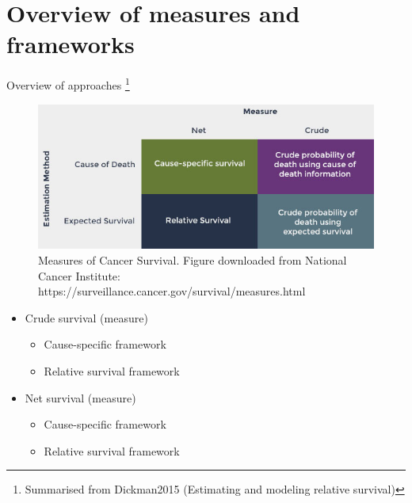 \documentclass{beamer}
\begin{document}
\section{Overview of measures and frameworks}
\begin{frame}{Overview of approaches \footnote{Summarised from Dickman2015 (Estimating and modeling relative survival)}}

\begin{figure}
    \centering
    \includegraphics[scale=0.35]{survival_table.jpg}
    \caption{Measures of Cancer Survival. Figure downloaded from National Cancer Institute: https://surveillance.cancer.gov/survival/measures.html}
    \label{fig:my_label}
\end{figure}
\vspace{-20pt}
\begin{itemize}
    \item Crude survival (measure)

    \begin{itemize}
        \item Cause-specific framework
        \item Relative survival framework
    \end{itemize}
    
    \item Net survival (measure)
      \begin{itemize}
        \item Cause-specific framework
        \item Relative survival framework
    \end{itemize}
\end{itemize}

\end{frame}
\end{document}
